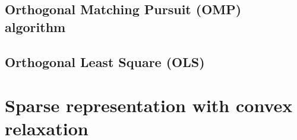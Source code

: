 \subsection{Orthogonal Matching Pursuit (OMP) algorithm}



\subsection{Orthogonal Least Square (OLS)}




\section{Sparse representation with convex relaxation}

